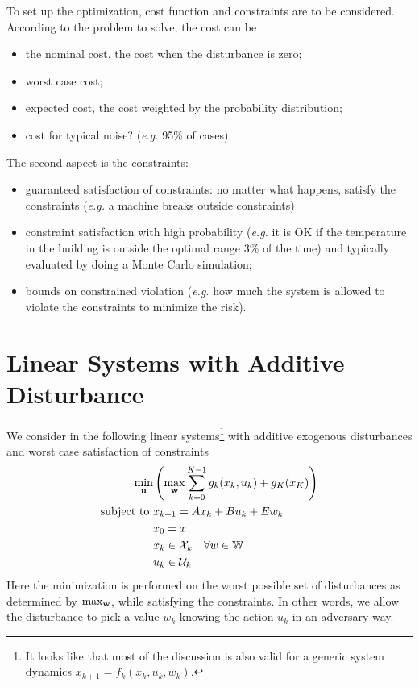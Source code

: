 To set up the optimization, cost function and constraints are to be considered. According to the problem to solve, the cost can be
\begin{itemize}
\item the nominal cost, the cost when the disturbance is zero;
\item worst case cost;
\item expected cost, the cost weighted by the probability distribution;
\item cost for typical noise? (\textit{e.g.} 95\% of cases).
\end{itemize}
The second aspect is the constraints:
\begin{itemize}
\item guaranteed satisfaction of constraints: no matter what happens, satisfy the constraints (\textit{e.g.} a machine breaks outside constraints)
\item constraint satisfaction with high probability (\textit{e.g.} it is OK if the temperature in the building is outside the optimal range 3\% of the time) and typically evaluated by doing a Monte Carlo simulation;
\item bounds on constrained violation (\textit{e.g.} how much the system is allowed to violate the constraints to minimize the risk).
\end{itemize}

\section{Linear Systems with Additive Disturbance}
\label{sec:linear-system-additive-disturbance}

We consider in the following linear systems\footnote{It looks like that most of the discussion is also valid for a generic system dynamics $x_{k+1}=f_k(x_k,u_k,w_k)$.} with additive exogenous disturbances and worst case satisfaction of constraints
\begin{equation}
  \label{eq:minimization-additive-disturbance}
  \begin{aligned}
    \min_{\boldsymbol{\mathrm{u}}} & \left(\max_{\boldsymbol{\mathrm{w}}} \sum_{k=0}^{K-1} g_k(x_k,u_k) + g_K(x_K)\right) \\
    \text{subject to } & x_{k+1} = Ax_k + Bu_k + Ew_k \\
                     & x_0 = x \\
                     & x_k \in \mathcal{X}_k\quad \forall w \in \mathbb{W} \\
                     & u_k \in \mathcal{U}_k
  \end{aligned}
\end{equation}
Here the minimization is performed on the worst possible set of disturbances as determined by $\max_{\boldsymbol{\mathrm{w}}}$, while satisfying the constraints. In other words, we allow the disturbance to pick a value $w_k$ knowing the action $u_k$ in an adversary way.

